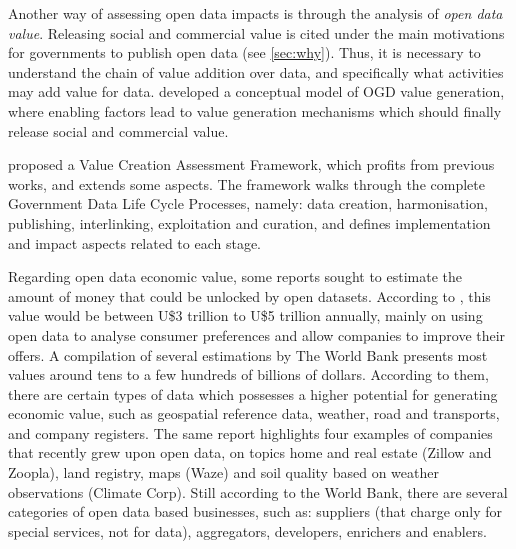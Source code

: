 Another way of assessing open data impacts is through the analysis of \emph{open data value}.
Releasing social and commercial value is cited under the main motivations for governments to publish open data (see \autoref{sec:why}).
Thus, it is necessary to understand the chain of value addition over data, and specifically what activities may add value for data.
 developed a conceptual model of OGD value generation, where enabling factors lead to value generation mechanisms which should finally release social and commercial value. 

 proposed a Value Creation Assessment Framework, which profits from previous works, and extends some aspects.
The framework walks through the complete Government Data Life Cycle Processes, namely: data creation, harmonisation, publishing, interlinking, exploitation and curation, and defines implementation and impact aspects related to each stage.

Regarding open data economic value, some reports sought to estimate the amount of money that could be unlocked by open datasets.
According to , this value would be between U\$3 trillion to U\$5 trillion  annually, mainly on using open data to analyse consumer preferences and allow companies to improve their offers.
A compilation of several estimations by The World Bank \cite{TheWorldBank2014} presents most values around tens to a few hundreds of billions of dollars.
According to them, there are certain types of data which possesses a higher potential for generating economic value, such as geospatial reference data, weather, road and transports, and company registers.
The same report highlights four examples of companies that recently grew upon open data, on topics home and real estate (Zillow and Zoopla), land registry, maps (Waze) and soil quality based on weather observations (Climate Corp).
Still according to the World Bank, there are several categories of open data based businesses, such as: suppliers (that charge only for special services, not for data), aggregators,  developers, enrichers and enablers.



